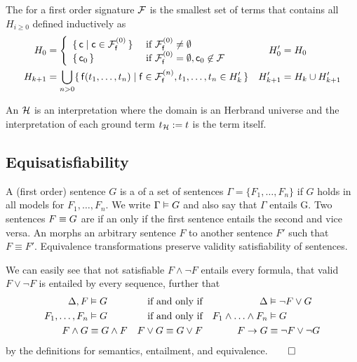 \begin{definition}\label{def:hk}
	The  for a first order signature \( \mathcal{F} \)
	is the smallest set of terms that contains all \( H_{i\geq 0} \) defined inductively as
	\begin{align*}
	H_0 &=
	\left \{
	\begin{array}{ll}
	\{ \, \mc \mid \mc\in\mcFfn[0] \, \} 
	&\text{if } \mcFfn[0]\not=\emptyset
	\\
	\{ \, \mc_0 \, \}
	&\text{if } \mcFfn[0]=\emptyset, \mc_0\not\in\mcF
	\end{array}
	\right.
	&
	H'_0 &= H_0
	\\
	H_{k+1} &= \bigcup_{n> 0}
	\{ \, \mf(t_1, \ldots, t_n) \mid{} \mf\in\mcFfn[n],
	t_1, \ldots, t_n \in{} H_k' \, \}
	&
	H'_{k+1} &= H_k \cup{} H'_{k+1}
	\end{align*}

\end{definition}

\begin{definition}
	An  \( \mathcal{H} \) is an interpretation where the domain
	is an Herbrand universe
	and the interpretation of each ground term \( t_{\mathcal{H}} := t \) is the term itself.
\end{definition}





\subsection{Equisatisfiability}

\begin{definition}\label{def:entailment}\label{def:equivalence}
	A (first order) sentence \( G \) is a 
	of a set of sentences
	\( \Gamma = \{ F_1,\ldots,F_n \} \) if \( G \) holds in all models for \( F_1,\ldots,F_n \).
	We write \( \Gamma\vDash G \) and also say that \( \Gamma \) entails G.
	Two sentences \( F \equiv G \) are 
	if an only if the first sentence entails the second and vice versa.
	An  morphs an arbitrary sentence \(F\)
	to another sentence \(F'\) such that \( F\equiv F'\).
	Equivalence transformations preserve
	validity  satisfiability
	of sentences.
\end{definition}

\begin{example}
	We can easily see that not satisfiable \( F\land\lnot F \) entails every formula,
	that valid \( F\lor\lnot F \) is entailed by every sequence, further that
	\begin{align*}
	\Delta, F&\vDash G  &\text{if and only if} && \Delta &\vDash \lnot F\lor G \\
	F_1,\ldots,F_n&\vDash G  &\text{if and only if} && F_1\land\ldots\land F_n&\vDash G\\
	F\land G&\equiv G\land F &F\lor G\equiv G\lor F && F\rightarrow G &\equiv \lnot F\lor \lnot G
	\end{align*}
	by the definitions for semantics, entailment, and equivalence.\hfill \( \qed \)
\end{example}

